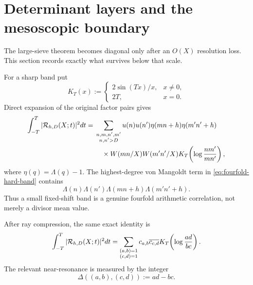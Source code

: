 \section{Determinant layers and the mesoscopic boundary}
\label{sec:determinant-boundary}

The large-sieve theorem becomes diagonal only after an $O(X)$ resolution
loss.  This section records exactly what survives below that scale.

For a sharp band put
\begin{equation}
 K_T(x):=
 \begin{cases}
  2\sin(Tx)/x,&x\ne0,\\
  2T,&x=0.
 \end{cases}
 \label{eq:sharp-band-kernel}
\end{equation}
Direct expansion of the original factor pairs gives
\begin{equation}
 \begin{aligned}
 \int_{-T}^{T}|\mathcal R_{h,D}(X;t)|^2dt
 ={}&\sum_{\substack{n,m,n',m'\\n,n'>D}}
 u(n)u(n')\eta(mn+h)\eta(m'n'+h)\\
 &\quad\times W(mn/X)W(m'n'/X)
 K_T\!\left(\log\frac{nm'}{mn'}\right),
 \end{aligned}
 \label{eq:fourfold-hard-band}
\end{equation}
where $\eta(q)=\Lambda(q)-1$.  The highest-degree von Mangoldt term in
\eqref{eq:fourfold-hard-band} contains
\[
 \Lambda(n)\Lambda(n')\Lambda(mn+h)\Lambda(m'n'+h).
\]
Thus a small fixed-shift band is a genuine fourfold arithmetic
correlation, not merely a divisor mean value.

After ray compression, the same exact identity is
\begin{equation}
 \int_{-T}^{T}|\mathcal R_{h,D}(X;t)|^2dt
 =\sum_{\substack{(a,b)=1\\(c,d)=1}}
 c_{a,b}\overline{c_{c,d}}
 K_T\!\left(\log\frac{ad}{bc}\right).
 \label{eq:ray-hard-kernel}
\end{equation}
The relevant near-resonance is measured by the integer
\begin{equation}
 \Delta((a,b),(c,d)):=ad-bc.
 \label{eq:ray-determinant}
\end{equation}

